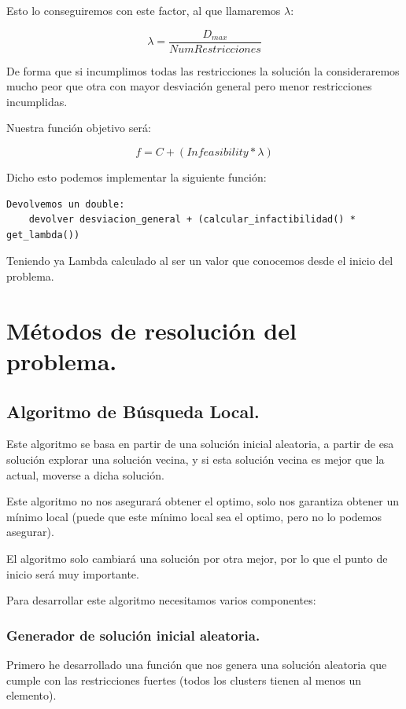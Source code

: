 \documentclass[12pt, spanish]{article}
\begin{document}
Esto lo conseguiremos con este factor, al que llamaremos $\lambda$:

$$ \lambda = \frac{D_{max}}{NumRestricciones} $$ 


De forma que si incumplimos todas las restricciones la solución la consideraremos mucho peor que otra con mayor desviación general pero menor restricciones incumplidas.

Nuestra función objetivo será:

$$ f = C + (\textit{Infeasibility} * \lambda) $$ 

Dicho esto podemos implementar la siguiente función:

\begin{lstlisting}
Devolvemos un double:
	devolver desviacion_general + (calcular_infactibilidad() * get_lambda())
\end{lstlisting}

Teniendo ya Lambda calculado al ser un valor que conocemos desde el inicio del problema.

\newpage

\section{Métodos de resolución del problema.}

\subsection{Algoritmo de Búsqueda Local.}

Este algoritmo se basa en partir de una solución inicial aleatoria, a partir de esa solución explorar una solución vecina, y si esta solución vecina es mejor que la actual, moverse a dicha solución.

Este algoritmo no nos asegurará obtener el optimo, solo nos garantiza obtener un mínimo local (puede que este mínimo local sea el optimo, pero no lo podemos asegurar).

El algoritmo solo cambiará una solución por otra mejor, por lo que el punto de inicio será muy importante.

Para desarrollar este algoritmo necesitamos varios componentes:
 
 \subsubsection{Generador de solución inicial aleatoria.}
 
 Primero he desarrollado una función que nos genera una solución aleatoria que cumple con las restricciones fuertes (todos los clusters tienen al menos un elemento).
 
\end{document}
